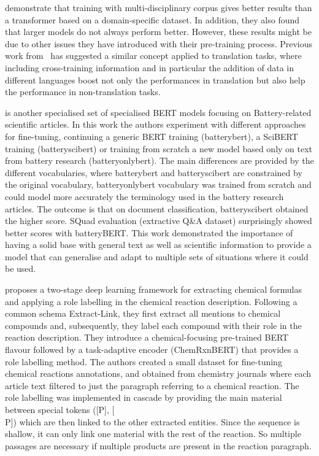\cite{hong2022ScholarBERT} demonstrate that training with multi-disciplinary corpus gives better results than a transformer based on a domain-specific dataset. In addition, they also found that larger models do not always perform better. However, these results might be due to other issues they have introduced with their pre-training process. 
Previous work from~\cite{lample2019cross} has suggested a similar concept applied to translation tasks, where including cross-training information and in particular the addition of data in different languages boost not only the performances in translation but also help the performance in non-translation tasks. 

\cite{huang2020batterybert} is another specialised set of specialised BERT models focusing on Battery-related scientific articles. In this work the authors experiment with different approaches for fine-tuning, continuing a generic BERT training (batterybert), a SciBERT training (batteryscibert) or training from scratch a new model based only on text from battery research (batteryonlybert). The main differences are provided by the different vocabularies, where batterybert and batteryscibert are constrained by the original vocabulary, batteryonlybert vocabulary was trained from scratch and could model more accurately the terminology used in the battery research articles. 
The outcome is that on document classification, batteryscibert obtained the higher score. SQuad evaluation (extractive Q\&A dataset) surprisingly showed better scores with batteryBERT. This work demonstrated the importance of having a solid base with general text as well as scientific information to provide a model that can generalise and adapt to multiple sets of situations where it could be used. 

\cite{guo2021automated} proposes a two-stage deep learning framework for extracting chemical formulas and applying a role labelling in the chemical reaction description. 
Following a common schema Extract-Link, they first extract all mentions to chemical compounds and, subsequently, they label each compound with their role in the reaction description. 
They introduce a chemical-focusing pre-trained BERT flavour followed by a task-adaptive encoder (ChemRxnBERT) that provides a role labelling method. 
The authors created a small dataset for fine-tuning chemical reactions annotations, and obtained from chemistry journals where each article text filtered to just the paragraph referring to a chemical reaction. 
The role labelling was implemented in cascade by providing the main material between special tokens ([P], [\\P]) which are then linked to the other extracted entities. Since the sequence is shallow, it can only link one material with the rest of the reaction. So multiple passages are necessary if multiple products are present in the reaction paragraph.  


